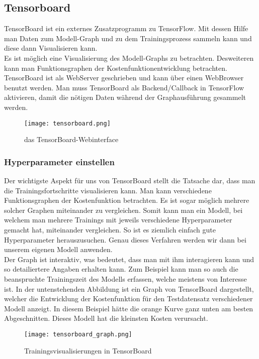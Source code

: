 \subsection{Tensorboard}
TensorBoard ist ein externes Zusatzprogramm zu TensorFlow. Mit dessen Hilfe
man Daten zum Modell-Graph und zu dem Trainingsprozess sammeln kann
und diese dann Visualisieren kann. \\
Es ist möglich eine Visualisierung des Modell-Graphs zu betrachten. Desweiteren
kann man Funktionsgraphen der Kostenfunktionentwicklung betrachten.
\para{}
TensorBoard ist als WebServer geschrieben und kann über einen WebBrowser
benutzt werden.
Man muss TensorBoard als Backend/Callback in TensorFlow aktivieren, damit die
nötigen Daten während der Graphausführung gesammelt werden.

\begin{figure}[h!]
  \centering
  \texttt{[image: tensorboard.png]}
  \caption{das TensorBoard-Webinterface}
\end{figure}

\subsubsection{Hyperparameter einstellen}
Der wichtigste Aspekt für uns von TensorBoard stellt die Tatsache dar, dass man
die Trainingsfortschritte visualisieren kann. Man kann verschiedene
Funktionsgraphen der Kostenfunktion betrachten. Es ist sogar möglich mehrere
solcher Graphen miteinander zu vergleichen. Somit kann man ein Modell, bei
welchem man mehrere Trainings mit jeweils verschiedene Hyperparameter gemacht
hat, miteinander vergleichen. So ist es ziemlich einfach gute Hyperparameter
herauszusuchen. Genau dieses Verfahren werden wir dann bei unserem eigenen
Modell anwenden. \\
Der Graph ist interaktiv, was bedeutet, dass man mit ihm interagieren kann und
so detailiertere Angaben erhalten kann. Zum Beispiel kann man so auch die
beanspruchte Trainingszeit des Modells erfassen, welche meistens von Interesse ist.
\para{}
In der untenstehenden Abbildung ist ein Graph von TensorBoard dargestellt,
welcher die Entwicklung der Kostenfunktion für den Testdatensatz verschiedener
Modell anzeigt. In diesem Beispiel hätte die orange Kurve ganz unten am besten
Abgeschnitten. Dieses Modell hat die kleinsten Kosten verursacht.

\begin{figure}[h!]
  \centering
  \texttt{[image: tensorboard\_graph.png]}
  \caption{Trainingsvisualisierungen in TensorBoard}
\end{figure}
\para{}

